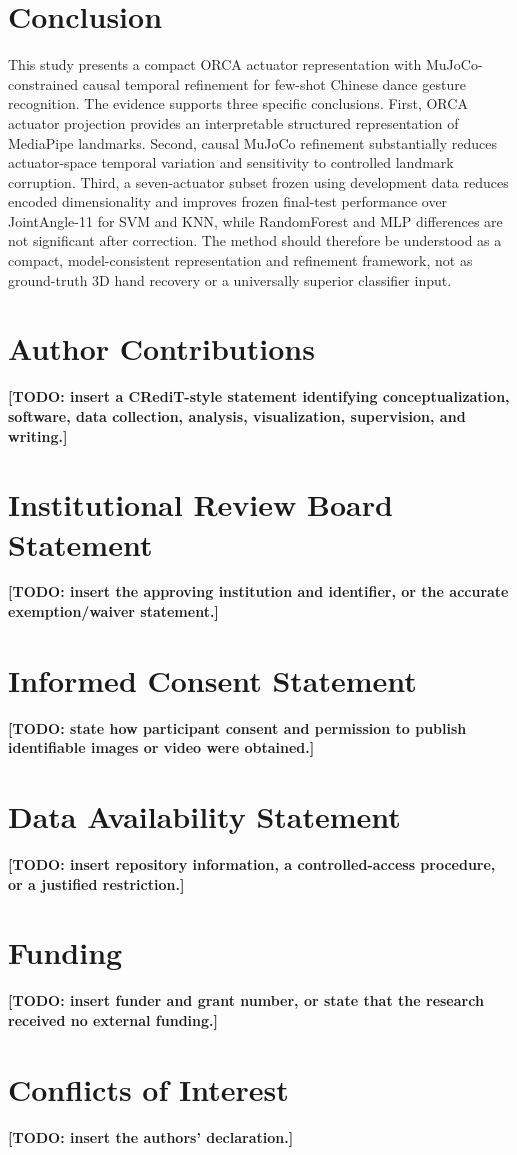 \documentclass[11pt]{article}
\begin{document}
\section{Conclusion}
This study presents a compact ORCA actuator representation with MuJoCo-constrained causal temporal refinement for few-shot Chinese dance gesture recognition. The evidence supports three specific conclusions. First, ORCA actuator projection provides an interpretable structured representation of MediaPipe landmarks. Second, causal MuJoCo refinement substantially reduces actuator-space temporal variation and sensitivity to controlled landmark corruption. Third, a seven-actuator subset frozen using development data reduces encoded dimensionality and improves frozen final-test performance over JointAngle-11 for SVM and KNN, while RandomForest and MLP differences are not significant after correction. The method should therefore be understood as a compact, model-consistent representation and refinement framework, not as ground-truth 3D hand recovery or a universally superior classifier input.

\section*{Author Contributions}
\textbf{[TODO: insert a CRediT-style statement identifying conceptualization, software, data collection, analysis, visualization, supervision, and writing.]}

\section*{Institutional Review Board Statement}
\textbf{[TODO: insert the approving institution and identifier, or the accurate exemption/waiver statement.]}

\section*{Informed Consent Statement}
\textbf{[TODO: state how participant consent and permission to publish identifiable images or video were obtained.]}

\section*{Data Availability Statement}
\textbf{[TODO: insert repository information, a controlled-access procedure, or a justified restriction.]}

\section*{Funding}
\textbf{[TODO: insert funder and grant number, or state that the research received no external funding.]}

\section*{Conflicts of Interest}
\textbf{[TODO: insert the authors' declaration.]}



\end{document}
